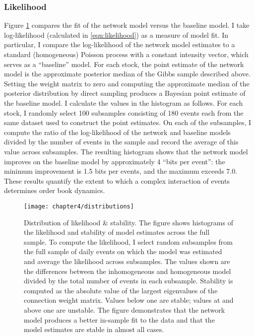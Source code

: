 		\subsubsection{Likelihood}
			Figure \ref{fig:distributions} compares the fit of the network model versus the baseline model. I take log-likelihood (calculated in \eqref{eqn:likelihood}) as a measure of model fit. In particular, I compare the log-likelihood of the network model estimates to a standard (homogeneous) Poisson process with a constant intensity vector, which serves as a “baseline” model. For each stock, the point estimate of the network model is the approximate posterior median of the Gibbs sample described above. Setting the weight matrix to zero and computing the approximate median of the posterior distribution by direct sampling produces a Bayesian point estimate of the baseline model. I calculate the values in the histogram as follows. For each stock, I randomly select 100 subsamples consisting of 180 events each from the same dataset used to construct the point estimates. On each of the subsamples, I compute the ratio of the log-likelihood of the network and baseline models divided by the number of events in the sample and record the average of this value across subsamples. The resulting histogram shows that the network model improves on the baseline model by approximately 4 ``bits per event'': the minimum improvement is 1.5 bits per events, and the maximum exceeds 7.0. These results quantify the extent to which a complex interaction of events determines order book dynamics.

			\begin{figure}[p]
				\small
				\linespread{1}
				\centering
				\texttt{[image: chapter4/distributions]}
				\captionsetup{skip=-20pt, position=below, font=footnotesize, justification=justified, width=\linewidth}
				\caption[Distribution of likelihood \& stability]{Distribution of likelihood \& stability. The figure shows histograms of the likelihood and stability of model estimates across the full sample. To compute the likelihood, I select random subsamples from the full sample of daily events on which the model was estimated and average the likelihood across subsamples. The values shown are the differences between the inhomogeneous and homogeneous model divided by the total number of events in each subsample. Stability is computed as the absolute value of the largest eigenvalues of the connection weight matrix. Values below one are stable; values at and above one are unstable.  The figure demonstrates that the network model produces a better in-sample fit to the data and that the model estimates are stable in almost all cases.}
				\label{fig:distributions}
			\end{figure}

